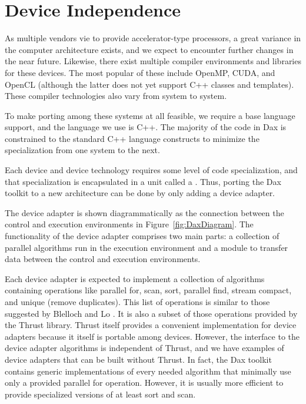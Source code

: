 \section{Device Independence}
\label{sec:DeviceIndependence}

As multiple vendors vie to provide accelerator-type processors, a great
variance in the computer architecture exists, and we expect to encounter
further changes in the near future. Likewise, there exist multiple compiler
environments and libraries for these devices. The most popular of these
include OpenMP, CUDA, and OpenCL (although the latter does not yet support
C++ classes and templates). These compiler technologies also vary from
system to system.

To make porting among these systems at all feasible, we require a base
language support, and the language we use is C++. The majority of the code
in Dax is constrained to the standard C++ language constructs to minimize
the specialization from one system to the next.


Each device and device technology requires some level of code
specialization, and that specialization is encapsulated in a unit called a
. Thus, porting the Dax toolkit to a new
architecture can be done by only adding a device adapter.

The device adapter is shown diagrammatically as
the connection between the control and execution environments in
Figure~\ref{fig:DaxDiagram}. The functionality of the device adapter
comprises two main parts: a collection of parallel algorithms run in the
execution environment and a module to transfer data between the control and
execution environments.

Each device adapter is expected to implement a collection of algorithms
containing operations like parallel for, scan, sort, parallel find, stream
compact, and unique (remove duplicates). This list of operations is similar
to those suggested by Blelloch and Lo
\etal{}. It is also a subset of those operations provided by
the Thrust library. Thrust itself provides a convenient
implementation for device adapters because it itself is portable among
devices. However, the interface to the device adapter algorithms is
independent of Thrust, and we have examples of device adapters that can be
built without Thrust. In fact, the Dax toolkit contains generic
implementations of every needed algorithm that minimally use only a
provided parallel for operation. However, it is usually more efficient to
provide specialized versions of at least sort and scan.

